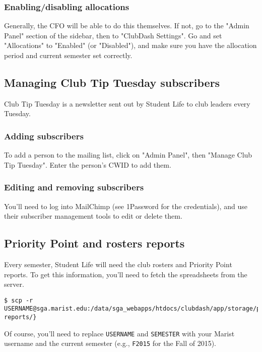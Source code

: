 \documentclass[11pt]{report}
\begin{document}
			\subsubsection{Enabling/disabling allocations}
				Generally, the CFO will be able to do this themselves. If not, go to the "Admin Panel" section of the sidebar, then to "ClubDash Settings". Go and set "Allocations" to "Enabled" (or "Disabled"), and make sure you have the allocation period and current semester set correctly.
		
		\subsection{Managing Club Tip Tuesday subscribers}
			Club Tip Tuesday is a newsletter sent out by Student Life to club leaders every Tuesday.
			
			\subsubsection{Adding subscribers}
				To add a person to the mailing list, click on "Admin Panel", then "Manage Club Tip Tuesday". Enter the person's CWID to add them.
			
			\subsubsection{Editing and removing subscribers}
				You'll need to log into MailChimp (see 1Password for the credentials), and use their subscriber management tools to edit or delete them.
				
		\subsection{Priority Point and rosters reports}
			Every semester, Student Life will need the club rosters and Priority Point reports. To get this information, you'll need to fetch the spreadsheets from the server.
			
			\hfill
			
			\begin{lstlisting}
$ scp -r USERNAME@sga.marist.edu:/data/sga_webapps/htdocs/clubdash/app/storage/prioritypoints/SEMESTER/* reports/}	
			\end{lstlisting}
			
			\hfill
			
			Of course, you'll need to replace \texttt{USERNAME} and \texttt{SEMESTER} with your Marist username and the current semester (e.g., \texttt{F2015} for the Fall of 2015).
		
\end{document}
